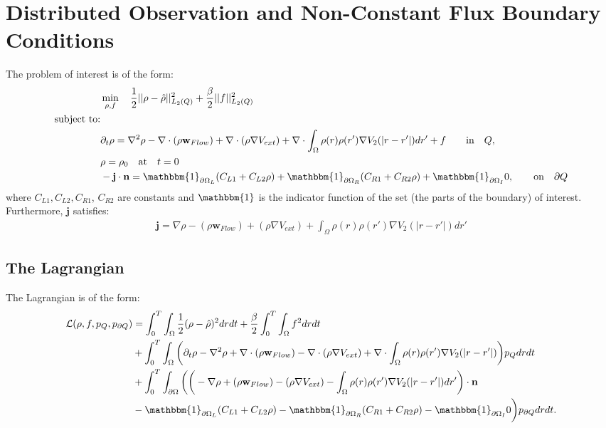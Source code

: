 \documentclass[11pt, a4paper]{article}
\newcommand{\Sta}{\rho}
\newcommand{\Adja}{{p}_Q}
\newcommand{\Adjc}{p_{\partial Q}}
\newcommand{\Con}{{f}}
\newcommand{\nor}{\mathbf{n}}
\theoremstyle{definition}
\begin{document}
\section{Distributed Observation and Non-Constant Flux Boundary Conditions}
The problem of interest is of the form:
\begin{align*}
&\min_{\Sta, \Con} \quad \frac{1}{2}|| \Sta -\hat \Sta||^2_{L_2(Q)} + \frac{\beta}{2}|| \Con||^2_{L_2(Q)}\\
\text{subject to:}\\
&\partial_t \rho = \nabla^2 \rho - \nabla \cdot (\rho \mathbf{w}_{Flow}) +\nabla \cdot (\rho \nabla V_{ext}) + \nabla \cdot \int_\Omega \rho(r) \rho(r') \nabla V_2(|r-r'|) dr' + \Con \quad  \quad\text{in} \quad Q,\notag\\
& \rho = \rho_0 \quad \text{at} \quad t=0 \notag\\
& - \mathbf{j} \cdot \nor = \mathbbm{1}_{\partial \Omega_L}( C_{L1}  + C_{L2}\Sta) +\mathbbm{1}_{\partial \Omega_R} ( C_{R1}  + C_{R2}\Sta) +\mathbbm{1}_{\partial \Omega_I} 0, \quad  \quad\text{on} \quad \partial Q 
\end{align*}
where $C_{L1}, C_{L2}, C_{R1}$, $C_{R2}$ are constants and $\mathbbm{1}$ is the indicator function of the set (the parts of the boundary) of interest.
Furthermore, $\mathbf{j}$ satisfies:
\begin{align*}
\mathbf{j}=\nabla \rho - (\rho \mathbf{w}_{Flow}) +(\rho \nabla V_{ext}) +  \int_\Omega \rho(r) \rho(r') \nabla V_2(|r-r'|) dr'
\end{align*}
\subsection*{The Lagrangian}
The Lagrangian is of the form:
\begin{align*}
\mathcal{L}(\Sta,\Con,\Adja,\Adjc ) &= \int_0^T \int_\Omega \frac{1}{2}(\Sta - \hat \Sta)^2 dr dt + \frac{\beta}{2}\int_0^T \int_\Omega \Con^2 drdt \\
&+ \int_0^T \int_\Omega \bigg( \partial_t \rho - \nabla^2 \rho + \nabla \cdot (\rho \mathbf{w}_{Flow}) -\nabla \cdot (\rho \nabla V_{ext}) + \nabla \cdot \int_\Omega \rho(r) \rho(r') \nabla V_2(|r-r'|) \bigg) \Adja dr dt\\
&+ \int_0^T \int_{\partial \Omega} \bigg( \bigg(-\nabla \rho+ (\rho \mathbf{w}_{Flow}) -(\rho \nabla V_{ext}) -  \int_\Omega \rho(r) \rho(r') \nabla V_2(|r-r'|) dr' \bigg)\cdot \nor\\
& -\mathbbm{1}_{\partial \Omega_L}( C_{L1}  + C_{L2}\Sta) -\mathbbm{1}_{\partial \Omega_R} ( C_{R1}  + C_{R2}\Sta) -\mathbbm{1}_{\partial \Omega_I} 0 \bigg) \Adjc dr dt.
\end{align*}
\end{document}
